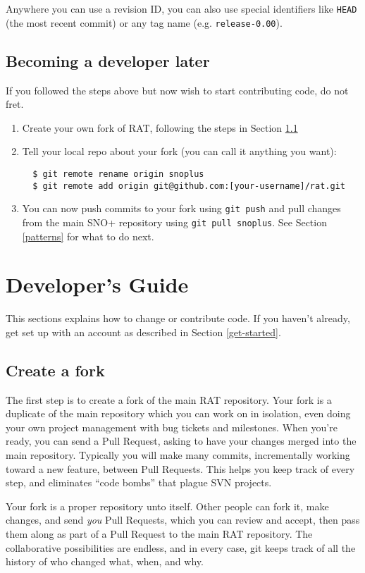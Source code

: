 \documentclass{article}
\begin{document}
Anywhere you can use a revision ID, you can also use special identifiers like {\tt HEAD} (the most recent commit) or any tag name (e.g. {\tt release-0.00}).

\subsection{Becoming a developer later}
If you followed the steps above but now wish to start contributing code, do not fret.
\begin{enumerate}
\item Create your own fork of RAT, following the steps in Section \ref{create-fork}
\item Tell your local repo about your fork (you can call it anything you want):
\begin{verbatim}
  $ git remote rename origin snoplus
  $ git remote add origin git@github.com:[your-username]/rat.git
\end{verbatim}
\item You can now push commits to your fork using {\tt git push} and pull changes from the main SNO+ repository using {\tt git pull snoplus}. See Section \ref{patterns} for what to do next.
\end{enumerate}

\section{Developer's Guide}
\label{devguide}
This sections explains how to change or contribute code. If you haven't already, get set up with an account as described in Section \ref{get-started}.
\subsection{Create a fork}
\label{create-fork}
The first step is to create a fork of the main RAT repository. Your fork is a duplicate of the main repository which you can work on in isolation, even doing your own project management with bug tickets and milestones. When you're ready, you can send a Pull Request, asking to have your changes merged into the main repository. Typically you will make many commits, incrementally working toward a new feature, between Pull Requests. This helps you keep track of every step, and eliminates ``code bombs'' that plague SVN projects.

Your fork is a proper repository unto itself. Other people can fork it, make changes, and send {\it you} Pull Requests, which you can review and accept, then pass them along as part of a Pull Request to the main RAT repository. The collaborative possibilities are endless, and in every case, git keeps track of all the history of who changed what, when, and why.\\
\end{document}
